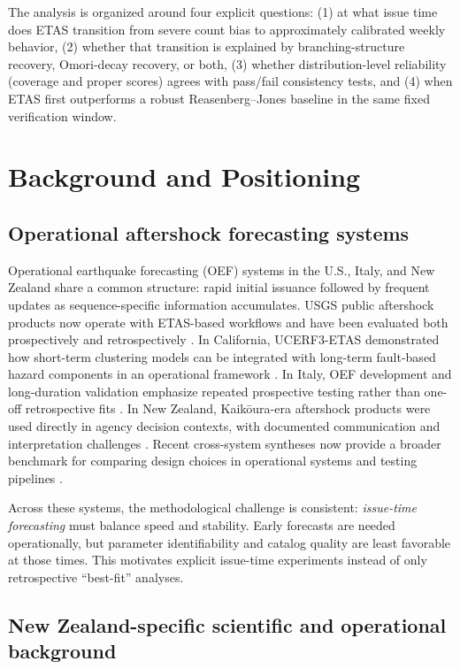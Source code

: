 \documentclass[12pt,letterpaper]{article}
\begin{document}
The analysis is organized around four explicit questions:
(1) at what issue time does ETAS transition from severe count bias to
approximately calibrated weekly behavior, (2) whether that transition is
explained by branching-structure recovery, Omori-decay recovery, or both,
(3) whether distribution-level reliability (coverage and proper scores) agrees
with pass/fail consistency tests, and (4) when ETAS first outperforms a robust
Reasenberg--Jones baseline in the same fixed verification window.

\section{Background and Positioning}

\subsection{Operational aftershock forecasting systems}

Operational earthquake forecasting (OEF) systems in the U.S., Italy, and
New Zealand share a common structure: rapid initial issuance followed by
frequent updates as sequence-specific information accumulates.
USGS public aftershock products now operate with ETAS-based workflows and have
been evaluated both prospectively and retrospectively
\cite{puertorico2022,page2016}. In California, UCERF3-ETAS demonstrated how
short-term clustering models can be integrated with long-term fault-based
hazard components in an operational framework \cite{field2017ucerf3etas}.
In Italy, OEF development and long-duration validation emphasize repeated
prospective testing rather than one-off retrospective fits
\cite{marzocchi2014,spassiani2023}. In New Zealand, Kaik\={o}ura-era aftershock
products were used directly in agency decision contexts, with documented
communication and interpretation challenges \cite{becker2020kaikoura}.
Recent cross-system syntheses now provide a broader benchmark for comparing
design choices in operational systems and testing pipelines
\cite{mizrahi2024oefreview,han2025oef,serafini2025benchmark}.

Across these systems, the methodological challenge is consistent:
\emph{issue-time forecasting} must balance speed and stability. Early forecasts
are needed operationally, but parameter identifiability and catalog quality are
least favorable at those times. This motivates explicit issue-time experiments
instead of only retrospective ``best-fit'' analyses.

\subsection{New Zealand-specific scientific and operational background}
\end{document}
